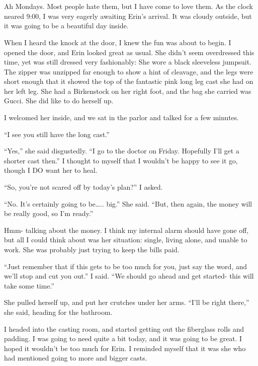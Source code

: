 \chapter{~}
Ah Mondays. Most people hate them, but I have come to love them. As the clock neared 9:00,
I was very eagerly awaiting Erin's arrival. It was cloudy outside, but it was going to be a
beautiful day inside.

When I heard the knock at the door, I knew the fun was about to begin. I opened the door,
and Erin looked great as usual. She didn't seem overdressed this time, yet was still dressed
very fashionably: She wore a black sleeveless jumpsuit. The zipper was unzipped far enough to
show a hint of cleavage, and the legs were short enough that it showed the top of the fantastic
pink long leg cast she had on her left leg. She had a Birkenstock on her right foot, and the bag
she carried was Gucci. She did like to do herself up.

I welcomed her inside, and we sat in the parlor and talked for a few minutes.

``I see you still have the long cast.''

``Yes,'' she said disgustedly. ``I go to the doctor on Friday. Hopefully I'll get a
shorter cast then.'' I thought to myself that I wouldn't be happy to see it go, though I DO want
her to heal.

``So, you're not scared off by today's plan?'' I asked.

``No. It's certainly going to be….. big.'' She said. ``But, then again, the money will be
really good, so I'm ready.''

Hmm- talking about the money. I think my internal alarm should have gone off, but all I
could think about was her situation: single, living alone, and unable to work. She was probably
just trying to keep the bills paid.

``Just remember that if this gets to be too much for you, just say the word, and we'll
stop and cut you out.'' I said. ``We should go ahead and get started- this will take some
time.''

She pulled herself up, and put her crutches under her arms. ``I'll be right there,'' she
said, heading for the bathroom.

I headed into the casting room, and started getting out the fiberglass rolls and padding.
I was going to need quite a bit today, and it was going to be great. I hoped it wouldn't be too
much for Erin. I reminded myself that it was she who had mentioned going to more and bigger
casts.

